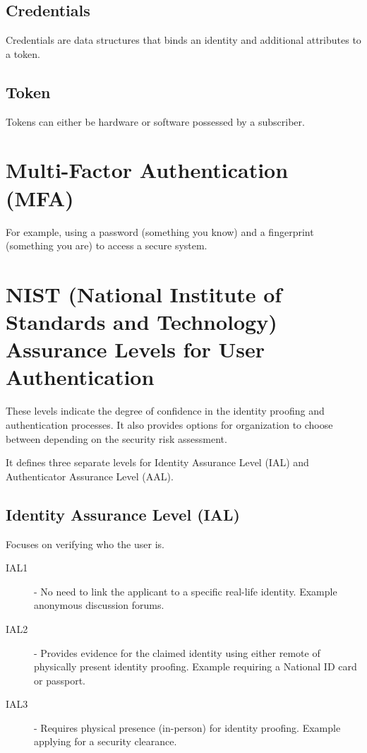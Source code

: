 \documentclass[12pt letter]{report}
\begin{document}
\subsection{Credentials}


Credentials are data structures that binds an identity and additional
attributes to a token.

\subsection{Token}


Tokens can either be hardware or software possessed by a subscriber.

\section{Multi-Factor Authentication (MFA)}


For example, using a password (something you know) and a fingerprint
(something you are) to access a secure system.

\section{NIST (National Institute of Standards and Technology)
Assurance Levels for User Authentication}

These levels indicate the degree of confidence in the identity
proofing and authentication processes. It also provides options for
organization to choose between depending on the security risk assessment.

It defines three separate levels for Identity Assurance Level (IAL)
and Authenticator Assurance Level (AAL).

\subsection{Identity Assurance Level (IAL)}
Focuses on verifying who the user is.
\begin{description}
  \item[IAL1]  - No need to link the applicant to a specific
    real-life identity. Example anonymous discussion forums.
  \item[IAL2] - Provides evidence for the claimed identity using
    either remote of physically present identity proofing. Example
    requiring a National ID card or passport.
  \item[IAL3] - Requires physical presence (in-person) for identity
    proofing. Example applying for a security clearance.
\end{description}
\end{document}
